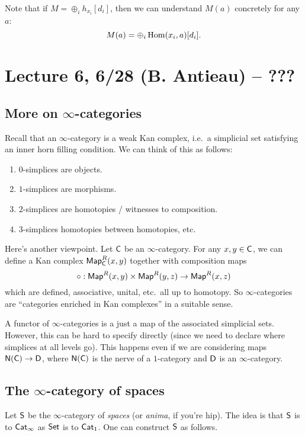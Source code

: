 \documentclass{amsart}
\begin{document}
Note that if $M = \oplus_i h_{x_i}[d_i]$, then we can understand $M(a)$ concretely for any $a$:
\[
M(a) = \oplus_i \operatorname{Hom}(x_i, a)[d_i].
\]

\section{Lecture 6, 6/28 (B. Antieau) -- ???}

\subsection{More on $\infty$-categories}

Recall that an $\infty$-category is a weak Kan complex, i.e.\ a simplicial set satisfying an inner horn filling condition.
We can think of this as follows:
\begin{enumerate}
	\item $0$-simplices are objects.
	\item $1$-simplices are morphisms.
	\item $2$-simplices are homotopies / witnesses to composition.
	\item $3$-simplices homotopies between homotopies, etc.
\end{enumerate}

Here's another viewpoint.
Let $\mathsf{C}$ be an $\infty$-category.
For any $x, y \in \mathsf{C}$, we can define a Kan complex $\mathsf{Map}^R_{\mathsf{C}}(x, y)$ together with composition maps
\[
	\circ: \mathsf{Map}^R(x, y) \times \mathsf{Map}^R(y, z) \to \mathsf{Map}^R(x, z)
\]
which are defined, associative, unital, etc.\ all up to homotopy.
So $\infty$-categories are ``categories enriched in Kan complexes'' in a suitable sense.

A functor of $\infty$-categories is a just a map of the associated simplicial sets.
However, this can be hard to specify directly (since we need to declare where simplices at all levels go).
This happens even if we are considering maps $\mathsf{N}(\mathsf{C}) \to \mathsf{D}$, where $\mathsf{N}(\mathsf{C})$ is the nerve of a $1$-category and $\mathsf{D}$ is an $\infty$-category.

\subsection{The $\infty$-category of spaces}

Let $\mathsf{S}$ be the $\infty$-category of \emph{spaces} (or \emph{anima}, if you're hip).
The idea is that $\mathsf{S}$ is to $\mathsf{Cat}_\infty$ as $\mathsf{Set}$ is to $\mathsf{Cat}_1$.
One can construct $\mathsf{S}$ as follows.
\end{document}
